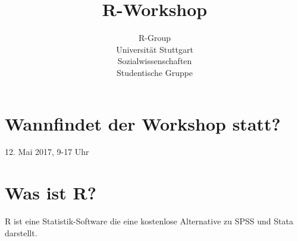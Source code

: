\documentclass[
]{leaflet}
\title{R-Workshop}
\author{R-Group \\
Universität Stuttgart\\
Sozialwissenschaften\\
Studentische Gruppe}
\date{}
\begin{document}
\maketitle
\thispagestyle{empty}


\section{Wannfindet der Workshop statt?}
12. Mai 2017, 9-17 Uhr

\section{Was ist R?}

R ist eine Statistik-Software die eine kostenlose Alternative zu SPSS und Stata darstellt. 


\end{document}

